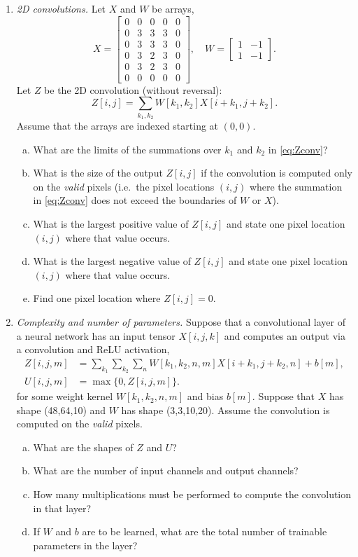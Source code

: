 \documentclass[11pt]{article}
\def\beq{\begin{equation}}
\def\eeq{\end{equation}}
\begin{document}
\begin{enumerate}
\item \emph{2D convolutions.}  Let $X$ and $W$ be arrays,
\[
    X = \left[ \begin{array}{ccccc}
        0 & 0 & 0 & 0 & 0 \\
        0 & 3 & 3 & 3 & 0 \\
        0 & 3 & 3 & 3 & 0 \\
        0 & 3 & 2 & 3 & 0 \\
        0 & 3 & 2 & 3 & 0 \\
        0 & 0 & 0 & 0 & 0
        \end{array} \right], \quad
    W = \left[ \begin{array}{cc}
        1 & -1 \\
        1 & -1
        \end{array} \right].
\]
Let $Z$ be the 2D convolution (without reversal):
\beq \label{eq:Zconv}
    Z[i,j] = \sum_{k_1,k_2} W[k_1,k_2]X[i+k_1,j+k_2].
\eeq
Assume that the arrays are indexed starting at $(0,0)$.
\begin{enumerate}[(a)]
\item What are the limits of the summations over $k_1$ and $k_2$ in \eqref{eq:Zconv}?
\item What is the size of the output $Z[i,j]$ if the convolution is computed only on the \emph{valid} pixels (i.e.\ the pixel locations $(i,j)$
where the summation in \eqref{eq:Zconv} does not exceed the boundaries of $W$ or $X$).
\item What is the largest positive value of $Z[i,j]$ and state one pixel location $(i,j)$ where that value occurs.
\item What is the largest negative value of $Z[i,j]$ and state one pixel location $(i,j)$ where that value occurs.
\item Find one pixel location where $Z[i,j]=0$.
\end{enumerate}


\item \emph{Complexity and number of parameters.}
Suppose that a convolutional layer of a neural network has an input tensor $X[i,j,k]$ and computes
an output via a convolution and ReLU activation,
\begin{align*}
    Z[i,j,m] &= \sum_{k_1} \sum_{k_2} \sum_n W[k_1,k_2,n,m]X[i+k_1,j+k_2,n] + b[m], \\
    U[i,j,m] &= \max\{0, Z[i,j,m] \}.
\end{align*}
for some weight kernel $W[k_1,k_2,n,m]$ and bias $b[m]$.  Suppose that $X$ has shape (48,64,10) and $W$ has shape (3,3,10,20).
Assume the convolution is computed on the \emph{valid} pixels.
\begin{enumerate}[(a)]
\item What are the shapes of $Z$ and $U$?
\item What are the number of input channels and output channels?
\item How many multiplications must be performed to compute the convolution in that layer?
\item If $W$ and $b$ are to be learned, what are the total number of trainable parameters in the layer?
\end{enumerate}



\end{enumerate}
\end{document}
